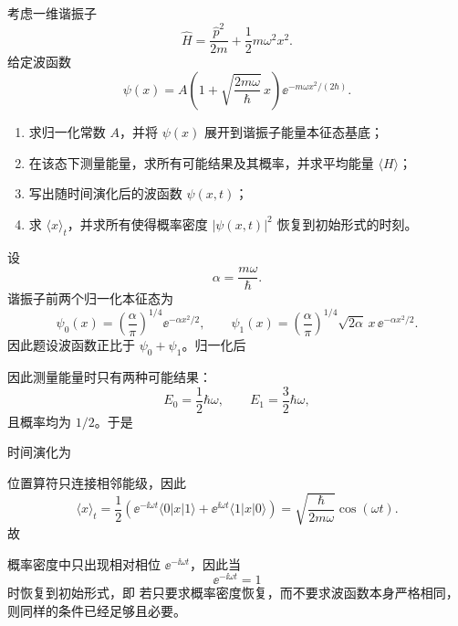 ﻿

\begin{question}
考虑一维谐振子
\[
\hat H=\frac{\hat p^2}{2m}+\frac12 m\omega^2 x^2.
\]
给定波函数
\[
\psi(x)=A\left(1+\sqrt{\frac{2m\omega}{\hbar}}\,x\right)\ee^{-m\omega x^2/(2\hbar)}.
\]

\begin{enumerate}[label=(\arabic*),leftmargin=2.5em]
  \item 求归一化常数 $A$，并将 $\psi(x)$ 展开到谐振子能量本征态基底；
  \item 在该态下测量能量，求所有可能结果及其概率，并求平均能量 $\langle H\rangle$；
  \item 写出随时间演化后的波函数 $\psi(x,t)$；
  \item 求 $\langle x\rangle_t$，并求所有使得概率密度 $|\psi(x,t)|^2$ 恢复到初始形式的时刻。
\end{enumerate}

\begin{solution}
设
\[
\alpha=\frac{m\omega}{\hbar}.
\]
谐振子前两个归一化本征态为
\[
\psi_0(x)=\left(\frac{\alpha}{\pi}\right)^{1/4}\ee^{-\alpha x^2/2},
\qquad
\psi_1(x)=\left(\frac{\alpha}{\pi}\right)^{1/4}\sqrt{2\alpha}\,x\,\ee^{-\alpha x^2/2}.
\]
因此题设波函数正比于 $\psi_0+\psi_1$。归一化后

因此测量能量时只有两种可能结果：
\[
E_0=\frac12\hbar\omega,
\qquad
E_1=\frac32\hbar\omega,
\]
且概率均为 $1/2$。于是

时间演化为

位置算符只连接相邻能级，因此
\[
\langle x\rangle_t=\frac12\left(\ee^{-\ii\omega t}\langle 0|x|1\rangle+\ee^{\ii\omega t}\langle 1|x|0\rangle\right)
=\sqrt{\frac{\hbar}{2m\omega}}\cos(\omega t).
\]
故

概率密度中只出现相对相位 $\ee^{-\ii\omega t}$，因此当
\[
\ee^{-\ii\omega t}=1
\]
时恢复到初始形式，即
若只要求概率密度恢复，而不要求波函数本身严格相同，则同样的条件已经足够且必要。
\end{solution}
\end{question}

